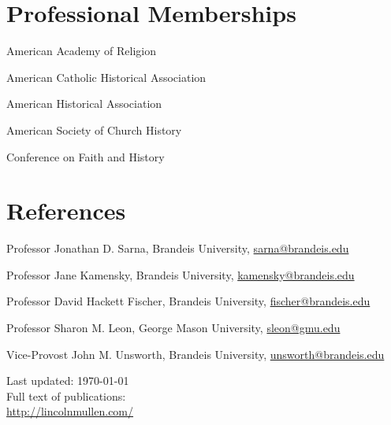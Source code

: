 \documentclass[11pt]{article}
\begin{document}
\section{Professional Memberships}

American Academy of Religion

American Catholic Historical Association

American Historical Association

American Society of Church History

Conference on Faith and History

\section{References}

Professor Jonathan D. Sarna, Brandeis University,
\href{mailto:sarna@brandeis.edu}{sarna@brandeis.edu}

Professor Jane Kamensky, Brandeis University, 
\href{mailto:kamensky@brandeis.edu}{kamensky@brandeis.edu}

Professor David Hackett Fischer, Brandeis University, 
\href{mailto:fischer@brandeis.edu}{fischer@brandeis.edu}

Professor Sharon M. Leon, George Mason University,
\href{mailto:sleon@gmu.edu}{sleon@gmu.edu}

Vice-Provost John M. Unsworth, Brandeis University, 
\href{mailto:unsworth@brandeis.edu}{unsworth@brandeis.edu}

\vfill{}

\begin{center}
  {\scriptsize 
    Last updated: \today\\[.25cm]
    Full text of publications:\\
    \href{http://lincolnmullen.com/}{http://lincolnmullen.com/}\\[.1cm]
  }
\end{center}
\end{document}
